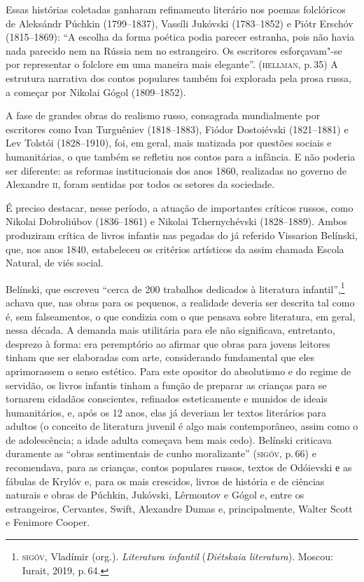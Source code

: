 Essas histórias coletadas ganharam refinamento literário nos poemas
folclóricos de Aleksándr Púchkin (1799--1837), Vassíli Jukóvski
(1783--1852) e Piótr Erschóv (1815--1869): ``A escolha da forma
poética podia parecer estranha, pois não havia nada parecido nem na
Rússia nem no estrangeiro. Os escritores esforçavam"-se por representar o
folclore em uma maneira mais elegante''. (\textsc{hellman}, p.\,35) A estrutura
narrativa dos contos populares também foi explorada pela prosa russa, a
começar por Nikolai Gógol (1809--1852).

A fase de grandes obras do realismo russo, consagrada mundialmente por
escritores como Ivan Turguêniev (1818--1883), Fiódor Dostoiévski
(1821--1881) e Lev Tolstói (1828--1910), foi, em geral, mais matizada
por questões sociais e humanitárias, o que também se refletiu nos contos
para a infância. E não poderia ser diferente: as reformas institucionais
dos anos 1860, realizadas no governo de Alexandre \textsc{ii}, foram sentidas por
todos os setores da sociedade.

É preciso destacar, nesse período, a atuação de importantes críticos
russos, como Nikolai Dobroliúbov (1836--1861) e Nikolai Tchernychévski
(1828--1889). Ambos produziram crítica de livros infantis nas pegadas do
já referido Vissarion Belínski, que, nos anos 1840, estabeleceu os
critérios artísticos da assim chamada Escola Natural, de viés social.

Belínski, que escreveu ``cerca de 200 trabalhos dedicados à literatura
infantil'',\footnote{\textsc{sigóv}, Vladímir (org.). \emph{Literatura infantil}
  (\emph{Diétskaia literatura}). Moscou: Iurait, 2019, p.\,64.} achava
que, nas obras para os pequenos, a realidade deveria ser descrita tal
como é, sem falseamentos, o que condizia com o que pensava sobre
literatura, em geral, nessa década. A demanda mais utilitária para ele
não significava, entretanto, desprezo à forma: era peremptório ao
afirmar que obras para jovens leitores tinham que ser elaboradas com
arte, considerando fundamental que eles aprimorassem o senso estético.
Para este opositor do absolutismo e do regime de servidão, os livros
infantis tinham a função de preparar as crianças para se tornarem
cidadãos conscientes, refinados esteticamente e munidos de ideais
humanitários, e, após os 12 anos, elas já deveriam ler textos literários
para adultos (o conceito de literatura juvenil é algo mais contemporâneo,
assim como o de adolescência; a idade adulta começava bem mais cedo).
Belínski criticava duramente as ``obras sentimentais de cunho
moralizante'' (\textsc{sigóv}, p.\,66) e recomendava, para as crianças, contos
populares russos, textos de Odóievski е as fábulas de Krylóv e, para os
mais crescidos, livros de história e de ciências naturais e obras de
Púchkin, Jukóvski, Lêrmontov e Gógol e, entre os estrangeiros,
Cervantes, Swift, Alexandre Dumas e, principalmente, Walter Scott e
Fenimore Cooper.

